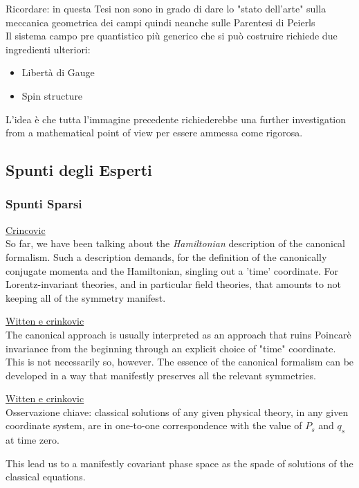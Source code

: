 \documentclass[Main]{subfiles}
\begin{document}
	\begin{Warning}
		Ricordare: in questa Tesi non sono in grado di dare lo "stato dell'arte"  sulla meccanica geometrica dei campi quindi neanche sulle Parentesi di Peierls\\
		Il sistema campo pre quantistico più generico che si può costruire richiede due ingredienti ulteriori:
			\begin{itemize}
				\item Libertà di Gauge
				\item Spin structure
			\end{itemize}		
			L'idea è che tutta l'immagine precedente richiederebbe una further investigation from a mathematical point of view per essere ammessa come rigorosa.
	\end{Warning}
		
		
	\subsection{Spunti degli Esperti}
	
		\subsubsection{Spunti Sparsi}
	
			\begin{Warning}
			\underline{Crincovic}\cite{Crnkovic1999}\\
			So far, we have been talking about the \emph{Hamiltonian} description of the canonical formalism.
			Such a description demands, for the definition of the canonically conjugate momenta and the Hamiltonian, singling out a 'time' coordinate. 
			For Lorentz-invariant theories, and in particular field theories, that amounts to not keeping all of the symmetry manifest. 
		\end{Warning}
		
		\begin{Warning}
			\underline{Witten e crinkovic}\\
			The canonical approach is usually interpreted as an approach that ruins Poincarè invariance from the beginning through an explicit choice of "time" coordinate.
			This is not necessarily so, however. The essence of the canonical formalism can be developed in a way that manifestly preserves all the relevant symmetries.		
		\end{Warning}
		
		\begin{Warning}
			\underline{Witten e crinkovic}\\
			Osservazione chiave:
			classical solutions of any given physical theory, in any given coordinate system, are in one-to-one correspondence with the value of $P_s$ and $q_s$ at time zero.
			
			This lead us to a manifestly covariant phase space as the spade of solutions of the classical equations.
		\end{Warning}
		
\end{document}
